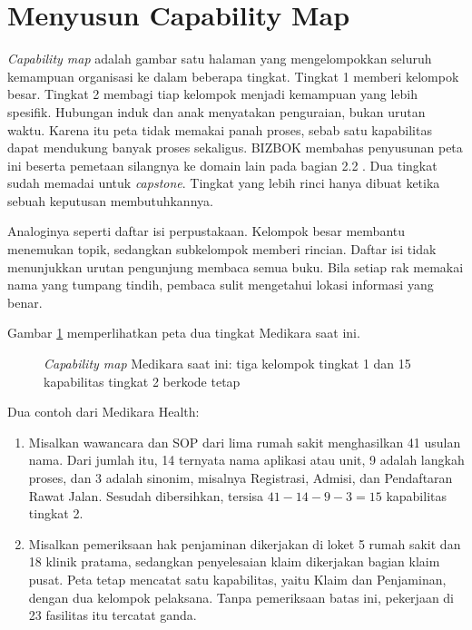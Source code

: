 \section{Menyusun Capability Map}

\textit{Capability map} adalah gambar satu halaman yang mengelompokkan seluruh kemampuan
organisasi ke dalam beberapa tingkat. Tingkat 1 memberi kelompok besar. Tingkat 2 membagi
tiap kelompok menjadi kemampuan yang lebih spesifik. Hubungan induk dan anak menyatakan
penguraian, bukan urutan waktu. Karena itu peta tidak memakai panah proses, sebab satu
kapabilitas dapat mendukung banyak proses sekaligus. BIZBOK membahas penyusunan peta ini
beserta pemetaan silangnya ke domain lain pada bagian 2.2 \cite{bizbok15}. Dua tingkat
sudah memadai untuk \textit{capstone}. Tingkat yang lebih rinci hanya dibuat ketika sebuah
keputusan membutuhkannya.

Analoginya seperti daftar isi perpustakaan. Kelompok besar membantu menemukan topik,
sedangkan subkelompok memberi rincian. Daftar isi tidak menunjukkan urutan pengunjung
membaca semua buku. Bila setiap rak memakai nama yang tumpang tindih, pembaca sulit
mengetahui lokasi informasi yang benar.

Gambar \ref{fig:ch05-peta-kapabilitas} memperlihatkan peta dua tingkat Medikara saat ini.

\begin{figure}[!htb]
  \centering
  
  \caption{\textit{Capability map} Medikara saat ini: tiga kelompok tingkat 1 dan 15
           kapabilitas tingkat 2 berkode tetap}
  \label{fig:ch05-peta-kapabilitas}
\end{figure}

Dua contoh dari Medikara Health:

\begin{enumerate}
  \item Misalkan wawancara dan SOP dari lima rumah sakit menghasilkan 41 usulan nama. Dari
        jumlah itu, 14 ternyata nama aplikasi atau unit, 9 adalah langkah proses, dan 3
        adalah sinonim, misalnya Registrasi, Admisi, dan Pendaftaran Rawat Jalan. Sesudah
        dibersihkan, tersisa $41 - 14 - 9 - 3 = 15$ kapabilitas tingkat 2.
  \item Misalkan pemeriksaan hak penjaminan dikerjakan di loket 5 rumah sakit dan 18 klinik
        pratama, sedangkan penyelesaian klaim dikerjakan bagian klaim pusat. Peta tetap
        mencatat satu kapabilitas, yaitu Klaim dan Penjaminan, dengan dua kelompok pelaksana.
        Tanpa pemeriksaan batas ini, pekerjaan di 23 fasilitas itu tercatat ganda.
\end{enumerate}

